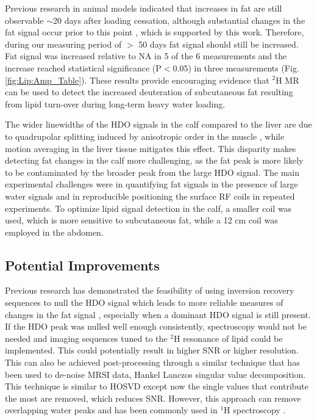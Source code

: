 Previous research in animal models indicated that increases in fat are still observable $\sim$20 days after loading cessation, although substantial changes in the fat signal occur prior to this point \cite{Brereton1986PreliminarySpectroscopy}, which is supported by this work. Therefore, during our measuring period of $>$ 50 days fat signal should still be increased. Fat signal was increased relative to \ac{NA} in 5 of the 6 measurements and the increase reached statistical significance (P$<$0.05) in three measurements (Fig. \ref{fig:Lip:Amp_Table}). These results provide encouraging evidence that $^2$H MR can be used to detect the increased deuteration of subcutaneous fat resulting from lipid turn-over during long-term heavy water loading. 

The wider linewidths of the \ac{HDO} signals in the calf compared to the liver are due to quadrupolar splitting induced by anisotropic order in the muscle \cite{Gursan2022ResidualMuscle}, while motion averaging in the liver tissue mitigates this effect. This disparity makes detecting fat changes in the calf more challenging, as the fat peak is more likely to be contaminated by the broader peak from the large \ac{HDO} signal. The main experimental challenges were in quantifying fat signals in the presence of large water signals and in reproducible positioning the surface RF coils in repeated experiments. To optimize lipid signal detection in the calf, a smaller coil was used, which is more sensitive to subcutaneous fat, while a 12 cm coil was employed in the abdomen. 

\subsection{Potential Improvements}

Previous research has demonstrated the feasibility of using inversion recovery sequences to null the HDO signal which leads to more reliable measures of changes in the fat signal \cite{Brereton1989TheMice}, especially when a dominant \ac{HDO} signal is still present. If the \ac{HDO} peak was nulled well enough consistently, spectroscopy would not be needed and imaging sequences tuned to the $^2$H resonance of lipid could be implemented. This could potentially result in higher \ac{SNR} or higher resolution. This can also be achieved post-processing through a similar technique that has been used to de-noise \ac{MRSI} data, Hankel Lanczos singular value decomposition. This technique is similar to \ac{HOSVD} except now the single values that contribute the most are removed, which reduces SNR. However, this approach can remove overlapping water peaks and has been commonly used in $^1$H spectroscopy \cite{Jansen20061HMetabolites, Cabanes2001OptimizationBrain}.

